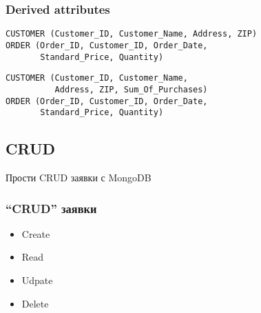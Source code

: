 \documentclass{beamer}
\begin{document}
\begin{frame}[fragile]
\frametitle{Derived attributes}

\begin{verbatim}
CUSTOMER (Customer_ID, Customer_Name, Address, ZIP)
ORDER (Order_ID, Customer_ID, Order_Date,
       Standard_Price, Quantity)
\end{verbatim}

\vspace{\baselineskip}

\begin{verbatim}
CUSTOMER (Customer_ID, Customer_Name,
          Address, ZIP, Sum_Of_Purchases)
ORDER (Order_ID, Customer_ID, Order_Date,
       Standard_Price, Quantity)
\end{verbatim}

\end{frame}

\subsection{CRUD}

\begin{frame}
\centerline{Прости CRUD заявки с MongoDB}
\end{frame}



\begin{frame}[fragile]
\frametitle{``CRUD'' заявки}


\begin{itemize}
  \item Create
  \item Read
  \item Udpate
  \item Delete
\end{itemize}

\end{frame}
\end{document}
